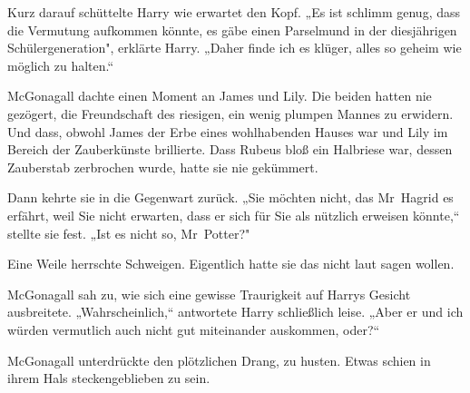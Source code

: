 Kurz darauf schüttelte Harry wie erwartet den Kopf. „Es ist schlimm genug, dass die Vermutung aufkommen könnte, es gäbe einen Parselmund in der diesjährigen Schülergeneration", erklärte Harry. „Daher finde ich es klüger, alles so geheim wie möglich zu halten.“

McGonagall dachte einen Moment an James und Lily. Die beiden hatten nie gezögert, die Freundschaft des riesigen, ein wenig plumpen Mannes zu erwidern. Und dass, obwohl James der Erbe eines wohlhabenden Hauses war und Lily im Bereich der Zauberkünste brillierte. Dass Rubeus bloß ein Halbriese war, dessen Zauberstab zerbrochen wurde, hatte sie nie gekümmert.

Dann kehrte sie in die Gegenwart zurück. „Sie möchten nicht, das Mr~Hagrid es erfährt, weil Sie nicht erwarten, dass er sich für Sie als nützlich erweisen könnte,“ stellte sie fest. „Ist es nicht so, Mr~Potter?"

Eine Weile herrschte Schweigen. Eigentlich hatte sie das nicht laut sagen wollen.

McGonagall sah zu, wie sich eine gewisse Traurigkeit auf Harrys Gesicht ausbreitete. „Wahrscheinlich,“ antwortete Harry schließlich leise. „Aber er und ich würden vermutlich auch nicht gut miteinander auskommen, oder?“

McGonagall unterdrückte den plötzlichen Drang, zu husten. Etwas schien in ihrem Hals steckengeblieben zu sein.

